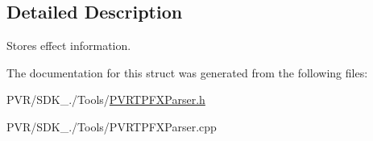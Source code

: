 \subsection{Detailed Description}
Stores effect information. 



 

The documentation for this struct was generated from the following files\+:\begin{DoxyCompactItemize}
\item 
P\+V\+R/\+S\+D\+K\+\_./\+Tools/\hyperlink{_p_v_r_t_p_f_x_parser_8h}{P\+V\+R\+T\+P\+F\+X\+Parser.\+h}\item 
P\+V\+R/\+S\+D\+K\+\_./\+Tools/P\+V\+R\+T\+P\+F\+X\+Parser.\+cpp\end{DoxyCompactItemize}
